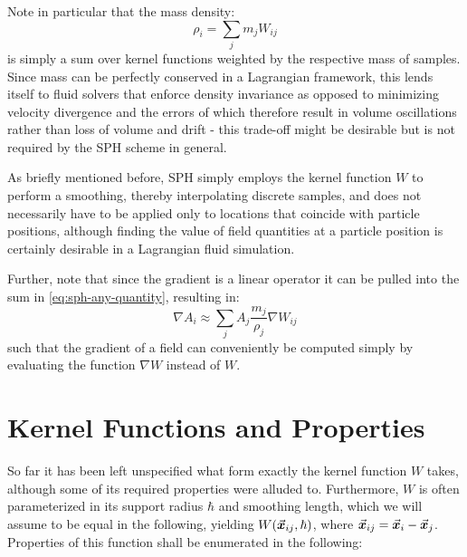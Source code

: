 Note in particular that the mass density:
\begin{equation}\label{eq:density-sph}
  \rho_i = \sum_j m_j W_{ij}
\end{equation} is simply a sum over kernel functions weighted by the respective mass of samples\autocite*{tutorial}. Since mass can be perfectly conserved in a Lagrangian framework, this lends itself to fluid solvers that enforce density invariance as opposed to minimizing velocity divergence and the errors of which therefore result in volume oscillations rather than loss of volume and drift - this trade-off might be desirable but is not required by the SPH scheme in general.

As briefly mentioned before, SPH simply employs the kernel function $W$ to perform a smoothing, thereby interpolating discrete samples, and does not necessarily have to be applied only to locations that coincide with particle positions, although finding the value of field quantities at a particle position is certainly desirable in a Lagrangian fluid simulation.

Further, note that since the gradient is a linear operator it can be pulled into the sum in \autoref{eq:sph-any-quantity}, resulting in\autocite*{tutorial}:
\begin{equation}\label{eq:sph-nabla-any-quantity}
  \nabla A_i \approx \sum_j A_j \frac{m_j}{\rho_j} \nabla W_{ij}
\end{equation}
such that the gradient of a field can conveniently be computed simply by evaluating the function $\nabla W$ instead of $W$.

\newpage
\section{Kernel Functions and Properties}

So far it has been left unspecified what form exactly the kernel function $W$ takes, although some of its required properties were alluded to. Furthermore, $W$ is often parameterized in its support radius $\hbar$ and smoothing length, which we will assume to be equal in the following, yielding $W(\vec{\bm{x}}_{ij}, \hbar)$, where $\vec{\bm{x}}_{ij} = \vec{\bm{x}}_i-\vec{\bm{x}}_j$. Properties of this function shall be enumerated in the following\autocite*{tutorial}:

